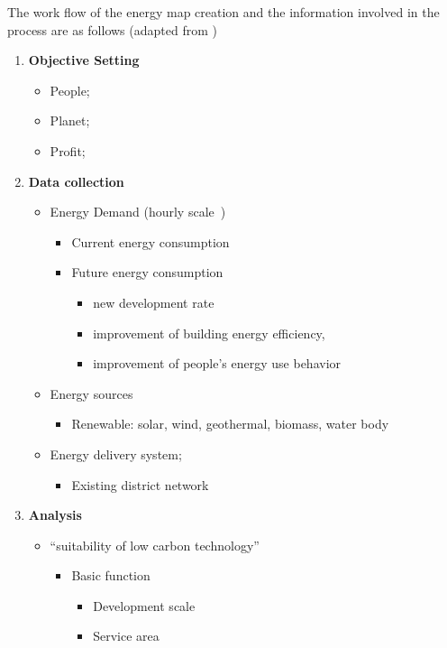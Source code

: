 \documentclass[hidelinks,12pt]{article}
\begin{document}
The work flow of the energy map creation and the information involved
in the process are as follows (adapted from \cite{IDEA2012})
\begin{enumerate}[{Step }1]
\item \textbf{Objective Setting}
  \begin{itemize}
  \item People;
  \item Planet;
  \item Profit;
  \end{itemize}
\item \textbf{Data collection}
  \begin{itemize}
  \item Energy Demand (hourly scale~\cite{Baird2014})
    \begin{itemize}
    \item Current energy consumption
    \item Future energy consumption
      \begin{itemize}
        \item new development rate
        \item improvement of building energy efficiency,
        \item improvement of people's energy use behavior
        \end{itemize}
      \end{itemize}
    \item Energy sources
      \begin{itemize}
      \item Renewable: solar, wind, geothermal, biomass, water body
      \end{itemize}
    \item Energy delivery system;
      \begin{itemize}
      \item Existing district network
      \end{itemize}
    \end{itemize}
  \item \textbf{Analysis}
    \begin{itemize}
    \item ``suitability of low carbon technology''~\cite{IDEA2012}
      \begin{itemize}
      \item Basic function
        \begin{itemize}
        \item Development scale
        \item Service area

\end{itemize}
\end{itemize}
\end{itemize}
\end{enumerate}
\end{document}
